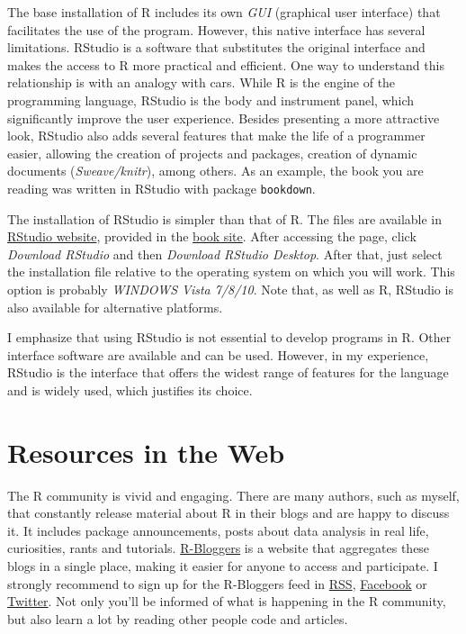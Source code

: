 \documentclass[11pt,]{book}
\begin{document}
The base installation of R includes its own \emph{GUI} (graphical user
interface) that facilitates the use of the program. However, this native
interface has several limitations. RStudio is a software that
substitutes the original interface and makes the access to R more
practical and efficient. One way to understand this relationship is with
an analogy with cars. While R is the engine of the programming language,
RStudio is the body and instrument panel, which significantly improve
the user experience. Besides presenting a more attractive look, RStudio
also adds several features that make the life of a programmer easier,
allowing the creation of projects and packages, creation of dynamic
documents (\emph{Sweave/knitr}), among others. As an example, the book
you are reading was written in RStudio with package \texttt{bookdown}.
 

The installation of RStudio is simpler than that of R. The files are
available in \href{https://www.rstudio.com/}{RStudio website}, provided
in the \href{https://sites.google.com/view/pafdr/home}{book site}. After
accessing the page, click \emph{Download RStudio} and then
\emph{Download RStudio Desktop}. After that, just select the
installation file relative to the operating system on which you will
work. This option is probably \emph{WINDOWS Vista 7/8/10}. Note that, as
well as R, RStudio is also available for alternative platforms.

I emphasize that using RStudio is not essential to develop programs in
R. Other interface software are available and can be used. However, in
my experience, RStudio is the interface that offers the widest range of
features for the language and is widely used, which justifies its
choice.

\section{Resources in the Web}\label{resources-in-the-web}

The R community is vivid and engaging. There are many authors, such as
myself, that constantly release material about R in their blogs and are
happy to discuss it. It includes package announcements, posts about data
analysis in real life, curiosities, rants and tutorials.
\href{https://www.r-bloggers.com/}{R-Bloggers} is a website that
aggregates these blogs in a single place, making it easier for anyone to
access and participate. I strongly recommend to sign up for the
R-Bloggers feed in \href{https://feeds.feedburner.com/RBloggers}{RSS},
\href{https://www.facebook.com/rbloggers/?fref=ts}{Facebook} or
\href{https://twitter.com/Rbloggers}{Twitter}. Not only you'll be
informed of what is happening in the R community, but also learn a lot
by reading other people code and articles.
\end{document}
